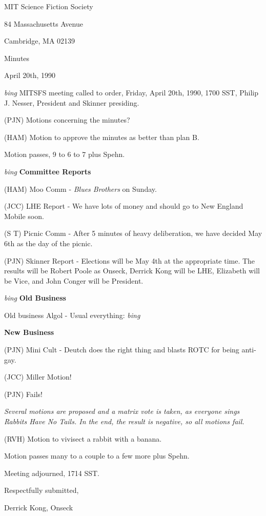 \setlength{\topmargin}{-0.5in}
\setlength{\oddsidemargin}{0.0in}
\setlength{\evensidemargin}{0.0in}
\setlength{\textheight}{9in}
\setlength{\textwidth}{6.5in}



\begin{center}
MIT Science Fiction Society

84 Massachusetts Avenue

Cambridge, MA 02139

\vspace{0.2in}
Minutes

April 20th, 1990

\end{center}
 
\vspace{0.15in}
{\em bing\/}  MITSFS meeting called to order, Friday, April 20th, 1990,
1700 SST, Philip J. Nesser, President and Skinner presiding.

(PJN) Motions concerning the minutes?

(HAM) Motion to approve the minutes as better than plan B.

Motion passes, 9 to 6 to 7 plus Spehn.

\vspace{0.15in}
{\em bing\/} {\bf Committee Reports}

(HAM) Moo Comm - {\em Blues Brothers} on Sunday.

(JCC) LHE Report - We have lots of money and should go to New England
Mobile soon.

(S T) Picnic Comm - After 5 minutes of heavy deliberation, we have
decided May 6th as the day of the picnic.

(PJN) Skinner Report - Elections will be May 4th at the appropriate
time.  The results will be Robert Poole as Onseck, Derrick Kong will
be LHE, Elizabeth will be Vice, and John Conger will be President.

\vspace{0.15in}
{\em bing\/} {\bf Old Business}

Old business Algol - Usual everything: {\em bing\/}

\vspace{0.15in}
{\bf New Business}

(PJN) Mini Cult - Deutch does the right thing and blasts ROTC for
being anti-gay.

(JCC) Miller Motion!

(PJN) Fails!

{\em Several motions are proposed and a matrix vote is taken, as
everyone sings Rabbits Have No Tails.  In the end, the result is
negative, so all motions fail.}

(RVH) Motion to vivisect a rabbit with a banana.

Motion passes many to a couple to a few more plus Spehn.

Meeting adjourned, 1714 SST.

\vspace{0.15in}
\begin{center}
Respectfully submitted,

Derrick Kong, Onseck
\end{center}

